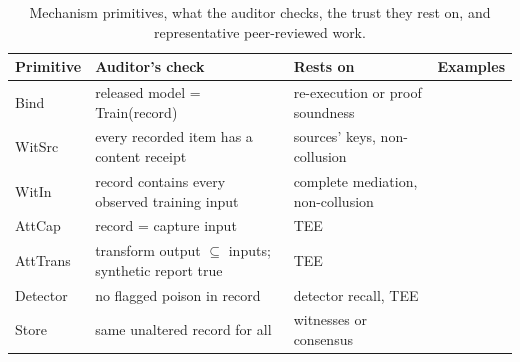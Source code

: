 \begin{table}[t]
\centering\scriptsize
\caption{Mechanism primitives, what the auditor checks, the trust they rest on, and
representative peer-reviewed work.}\label{tab:sok}
\begin{tabular}{@{}p{1.2cm}p{2.4cm}p{1.6cm}p{2.1cm}@{}}
\toprule
Primitive & Auditor's check & Rests on & Examples\\
\midrule
Bind & released model = Train(record) & re-execution or proof soundness & \cite{jia2021pol,abbaszadeh2024zkpot,tan2025zkpot,liao2026verilora}\\
WitSrc & every recorded item has a content receipt & sources' keys, non-collusion & \cite{stokes2021prevent,newman2022sigstore,torresarias2019intoto}\\
WitIn & record contains every observed training input & complete mediation, non-collusion & \cite{huang2026exia}\\
AttCap & record = capture input & TEE & \cite{spoczynski2025atlas,duddu2025laminator}\\
AttTrans & transform output $\subseteq$ inputs; synthetic report true & TEE & \cite{spoczynski2025atlas,duddu2025laminator}\\
Detector & no flagged poison in record & detector recall, TEE & \cite{tran2018spectral,hailemariam2025poisonspot,goldblum2023dataset}\\
Store & same unaltered record for all & witnesses or consensus & \cite{rfc6962,li2025auditablellm,mehammed2025fl}\\
\bottomrule
\end{tabular}
\end{table}

